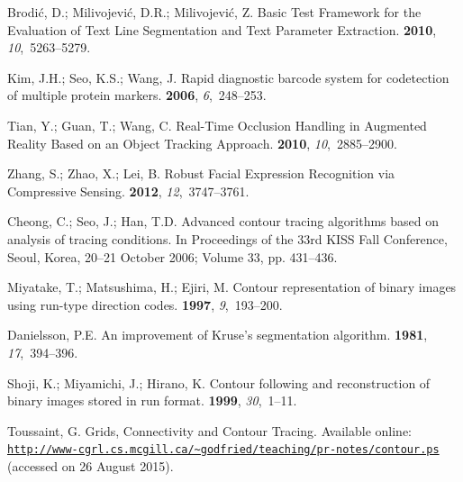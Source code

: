 \documentclass[sensors,article,accept,moreauthors,pdftex,10pt,a4paper]{mdpi}
\begin{document}
\begin{thebibliography}{999}
Brodić, D.; Milivojević, D.R.; Milivojević, Z.
\newblock Basic Test Framework for the Evaluation of Text Line Segmentation and
 Text Parameter Extraction.
 {\bf 2010}, {\em 10},~5263--5279.

Kim, J.H.; Seo, K.S.; Wang, J.
\newblock Rapid diagnostic barcode system for codetection of multiple protein
 markers.
 {\bf 2006}, {\em 6},~248--253.

Tian, Y.; Guan, T.; Wang, C.
\newblock Real-Time Occlusion Handling in Augmented Reality Based on an Object
 Tracking Approach.
 {\bf 2010}, {\em 10},~2885--2900.

Zhang, S.; Zhao, X.; Lei, B.
\newblock Robust Facial Expression Recognition via Compressive Sensing.
 {\bf 2012}, {\em 12},~3747--3761.

Cheong, C.; Seo, J.; Han, T.D.
\newblock Advanced contour tracing algorithms based on analysis of tracing
 conditions.
\newblock In Proceedings of the 33rd KISS Fall Conference, Seoul, Korea, 20--21 October 2006; Volume
 33, pp. 431--436.

Miyatake, T.; Matsushima, H.; Ejiri, M.
\newblock Contour representation of binary images using run-type direction
 codes.
 {\bf 1997}, {\em 9},~193--200.

Danielsson, P.E.
\newblock An improvement of Kruse's segmentation algorithm.
 {\bf 1981}, {\em
 17},~394--396.

Shoji, K.; Miyamichi, J.; Hirano, K.
\newblock Contour following and reconstruction of binary images stored in run
 format.
 {\bf 1999}, {\em 30},~1--11.

Toussaint, G.
\newblock Grids, Connectivity and Contour Tracing.
\newblock
 Available online: \href{http://www-cgrl.cs.mcgill.ca/~godfried/teaching/pr-notes/contour.ps}{\nolinkurl{http://www-cgrl.cs.mcgill.ca/~godfried/teaching/pr-notes/contour.ps}} (accessed on 26 August 2015).


\end{thebibliography}
\end{document}

